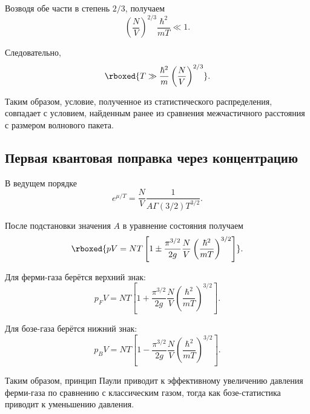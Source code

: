 \documentclass[../final.tex]{subfiles}
\begin{document}
Возводя обе части в степень $2/3$, получаем
%
\begin{equation*}
    \left(
        \frac{N}{V}
    \right)^{2/3}
    \frac{\hbar^2}{mT}
    \ll
    1.
\end{equation*}

Следовательно,
%
\[
    \rboxed{
        T
        \gg
        \frac{\hbar^2}{m}
        \left(
            \frac{N}{V}
        \right)^{2/3}
    }.
\]

Таким образом, условие, полученное из статистического распределения,
совпадает с условием, найденным ранее из сравнения межчастичного
расстояния с размером волнового пакета.


\subsection{Первая квантовая поправка через концентрацию}

В ведущем порядке
%
\begin{equation*}
    e^{\mu/T}
    =
    \frac{N}{V}
    \frac{1}{
        A
        \Gamma(3/2)
        T^{3/2}
    }.
\end{equation*}

После подстановки значения $A$ в уравнение состояния получаем
%
\[
    \rboxed{
        pV
        =
        NT
        \left[
            1
            \pm
            \frac{\pi^{3/2}}{2g}
            \frac{N}{V}
            \left(
                \frac{\hbar^2}{mT}
            \right)^{3/2}
        \right]
    }.
\]

Для ферми-газа берётся верхний знак:
%
\begin{equation*}
    p_F V
    =
    NT
    \left[
        1
        +
        \frac{\pi^{3/2}}{2g}
        \frac{N}{V}
        \left(
            \frac{\hbar^2}{mT}
        \right)^{3/2}
    \right].
\end{equation*}

Для бозе-газа берётся нижний знак:
%
\begin{equation*}
    p_B V
    =
    NT
    \left[
        1
        -
        \frac{\pi^{3/2}}{2g}
        \frac{N}{V}
        \left(
            \frac{\hbar^2}{mT}
        \right)^{3/2}
    \right].
\end{equation*}

Таким образом, принцип Паули приводит к эффективному увеличению
давления ферми-газа по сравнению с классическим газом, тогда как
бозе-статистика приводит к уменьшению давления.
\end{document}
